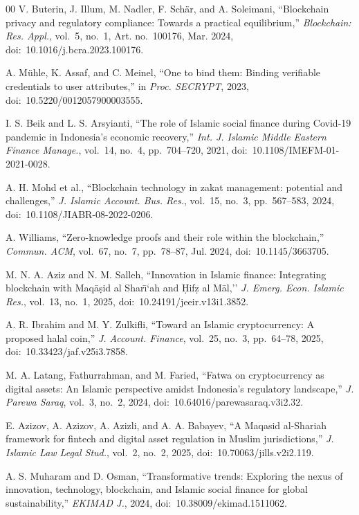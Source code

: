\documentclass[conference]{IEEEtran}
\begin{document}
\begin{thebibliography}{00}
V. Buterin, J. Illum, M. Nadler, F. Sch\"{a}r, and A. Soleimani, ``Blockchain privacy and regulatory compliance: Towards a practical equilibrium,'' \textit{Blockchain: Res. Appl.}, vol.~5, no.~1, Art. no.~100176, Mar. 2024, doi:~10.1016/j.bcra.2023.100176.

A. M\"{u}hle, K. Assaf, and C. Meinel, ``One to bind them: Binding verifiable credentials to user attributes,'' in \textit{Proc. SECRYPT}, 2023, doi:~10.5220/0012057900003555.

I. S. Beik and L. S. Arsyianti, ``The role of Islamic social finance during Covid-19 pandemic in Indonesia's economic recovery,'' \textit{Int. J. Islamic Middle Eastern Finance Manage.}, vol.~14, no.~4, pp.~704--720, 2021, doi:~10.1108/IMEFM-01-2021-0028.

A. H. Mohd et al., ``Blockchain technology in zakat management: potential and challenges,'' \textit{J. Islamic Account. Bus. Res.}, vol.~15, no.~3, pp.~567--583, 2024, doi:~10.1108/JIABR-08-2022-0206.

A. Williams, ``Zero-knowledge proofs and their role within the blockchain,'' \textit{Commun. ACM}, vol.~67, no.~7, pp.~78--87, Jul. 2024, doi:~10.1145/3663705.

M. N. A. Aziz and N. M. Salleh, ``Innovation in Islamic finance: Integrating blockchain with Maq\={a}\d{s}id al Shar\={\i}`ah and \d{H}if\d{z} al M\={a}l,'' \textit{J. Emerg. Econ. Islamic Res.}, vol.~13, no.~1, 2025, doi:~10.24191/jeeir.v13i1.3852.

A. R. Ibrahim and M. Y. Zulkifli, ``Toward an Islamic cryptocurrency: A proposed halal coin,'' \textit{J. Account. Finance}, vol.~25, no.~3, pp.~64--78, 2025, doi:~10.33423/jaf.v25i3.7858.

M. A. Latang, Fathurrahman, and M. Faried, ``Fatwa on cryptocurrency as digital assets: An Islamic perspective amidst Indonesia's regulatory landscape,'' \textit{J. Parewa Saraq}, vol.~3, no.~2, 2024, doi:~10.64016/parewasaraq.v3i2.32.

E. Azizov, A. Azizov, A. Azizli, and A. A. Babayev, ``A Maqasid al-Shariah framework for fintech and digital asset regulation in Muslim jurisdictions,'' \textit{J. Islamic Law Legal Stud.}, vol.~2, no.~2, 2025, doi:~10.70063/jills.v2i2.119.

A. S. Muharam and D. Osman, ``Transformative trends: Exploring the nexus of innovation, technology, blockchain, and Islamic social finance for global sustainability,'' \textit{EKIMAD J.}, 2024, doi:~10.38009/ekimad.1511062.


\end{thebibliography}
\end{document}

